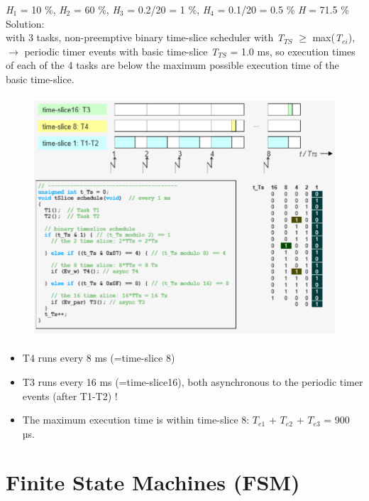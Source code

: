 \begin{enumerate}
\textit{ H}${}_{1}$ = 10 \%, \textit{H}${}_{2}$ = 60 \%, \textit{H}${}_{3}$ = 0.2/20 = 1 \%, \textit{H}${}_{4}$ = 0.1/20 = 0.5 \%  \textit{H} = 71.5 \%\\

Solution:\\
with 3 tasks, non-preemptive binary time-slice scheduler with \textit{T${}_{TS}$} $\mathrm{\ge}$ max(\textit{T${}_{ei}$}), \\

$\rightarrow$ periodic timer events with basic time-slice \textit{T${}_{TS}$} = 1.0 ms, so execution times of each of the 4 tasks are below the maximum possible execution time of the basic time-slice.

	\begin{figure}[h]
    \centering
    \includegraphics[width=14cm, height=9cm]{Images/image157.png}
    \label{fig:Fig 108}
    \end{figure}
   
\begin{itemize}
\item T4 runs every 8 ms (=time-slice 8)
\item T3 runs every 16 ms (=time-slice16), both asynchronous to the periodic timer events  (after T1-T2) !
\item The maximum execution time is within time-slice 8: $T_{e1}$ + $T_{e2}$ + $T_{e3}$ = 900 µs.
\end{itemize}
\end{enumerate} 
\newpage 

\section{Finite State Machines (FSM)}

